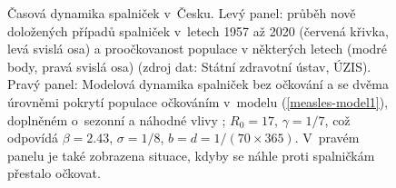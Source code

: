 \begin{figure}[ht]
\begin{center}
\begin{minipage}[m]{0.45\linewidth}
		\end{minipage}
	\end{center}
	\caption{Časová dynamika spalniček v~Česku. Levý panel: průběh nově doložených případů spalniček v~letech 1957 až 2020 (červená křivka, levá svislá osa) a proočkovanost populace v některých letech (modré body, pravá svislá osa) (zdroj dat: Státní zdravotní ústav, ÚZIS). Pravý panel: Modelová dynamika spalniček bez očkování a se dvěma úrovněmi pokrytí populace očkováním v~modelu (\ref{measles-model1}), doplněném o~sezonní a náhodné vlivy \cite{KeelingRohani2008}; $R_0=17$, $\gamma=1/7$, což odpovídá $\beta=2.43$, $\sigma=1/8$, $b=d=1/(70\times365)$. V~pravém panelu je také zobrazena situace, kdyby se náhle proti spalničkám přestalo očkovat.}
	\label{measles1}
\end{figure}

